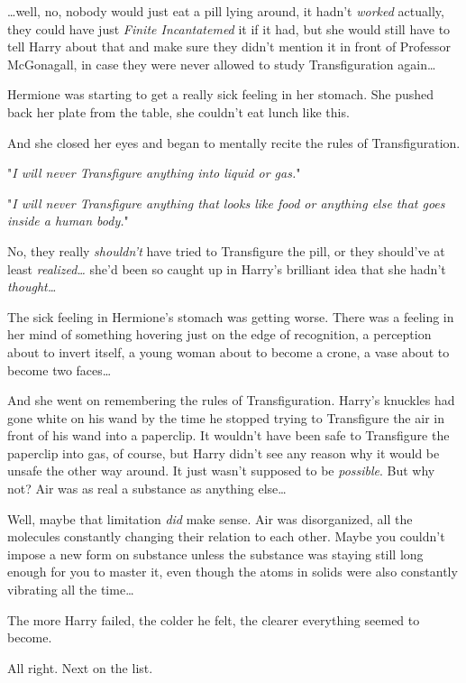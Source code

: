 {\ldots}well, no, nobody would just eat a pill lying around, it hadn't
\emph{worked} actually, they could have just \emph{Finite Incantatemed} it if
it had, but she would still have to tell Harry about that and make sure they
didn't mention it in front of Professor McGonagall, in case they were never
allowed to study Transfiguration again{\ldots}

Hermione was starting to get a really sick feeling in her stomach. She pushed
back her plate from the table, she couldn't eat lunch like this.

And she closed her eyes and began to mentally recite the rules of
Transfiguration.

"\emph{I will never Transfigure anything into liquid or gas.}"

"\emph{I will never Transfigure anything that looks like food or anything else
that goes inside a human body.}"

No, they really \emph{shouldn't} have tried to Transfigure the pill, or they
should've at least \emph{realized{\ldots}} she'd been so caught up in Harry's
brilliant idea that she hadn't \emph{thought{\ldots}}

The sick feeling in Hermione's stomach was getting worse. There was a feeling
in her mind of something hovering just on the edge of recognition, a perception
about to invert itself, a young woman about to become a crone, a vase about to
become two faces{\ldots}

And she went on remembering the rules of Transfiguration.
\later
Harry's knuckles had gone white on his wand by the time he stopped trying to
Transfigure the air in front of his wand into a paperclip. It wouldn't have
been safe to Transfigure the paperclip into gas, of course, but Harry didn't
see any reason why it would be unsafe the other way around. It just wasn't
supposed to be \emph{possible}. But why not? Air was as real a substance as
anything else{\ldots}

Well, maybe that limitation \emph{did} make sense. Air was disorganized, all
the molecules constantly changing their relation to each other. Maybe you
couldn't impose a new form on substance unless the substance was staying still
long enough for you to master it, even though the atoms in solids were also
constantly vibrating all the time{\ldots}

The more Harry failed, the colder he felt, the clearer everything seemed to
become.

All right. Next on the list.

